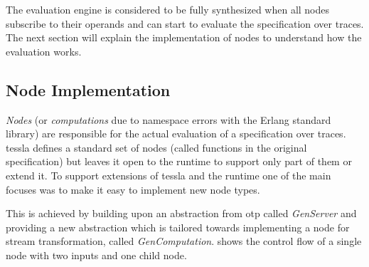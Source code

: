The evaluation engine is considered to be fully synthesized when all nodes subscribe to their operands and can start to evaluate the specification over traces.
The next section will explain the implementation of nodes to understand how the evaluation works.

\subsection{Node Implementation}
\label{sec:implementation:tesslaserver:nodes}

\emph{Nodes} (or \emph{computations} due to namespace errors with the Erlang standard library) are responsible for the actual evaluation of a specification over traces.
\Gls{tessla} defines a standard set of nodes (called functions in the original specification) but leaves it open to the runtime to support only part of them or extend it.
To support extensions of \gls{tessla} and the runtime one of the main focuses was to make it easy to implement new node types.

This is achieved by building upon an abstraction from \gls{otp} called \emph{GenServer} and providing a new abstraction which is tailored towards implementing a node for stream transformation, called \emph{GenComputation}.
 shows the control flow of a single node with two inputs and one child node.

